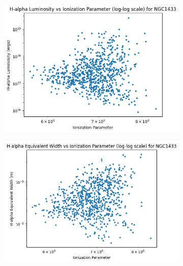 \documentclass[12pt]{report}
\begin{document}
\begin{figure}[htbp]
\begin{subfigure}{0.3\textwidth}
        \label{fig:image9}
    \end{subfigure}
    
    \vspace{0.5cm}
    \caption*{NGC1433}
    
    \begin{subfigure}{0.3\textwidth}
        \centering
        \includegraphics[width=\linewidth]{image10.png}
        \label{fig:image10}
    \end{subfigure}
    \hfill
    \begin{subfigure}{0.3\textwidth}
        \centering
        \includegraphics[width=\linewidth]{image11.png}
        \label{fig:image11}
    \end{subfigure}

\end{figure}
\end{document}
